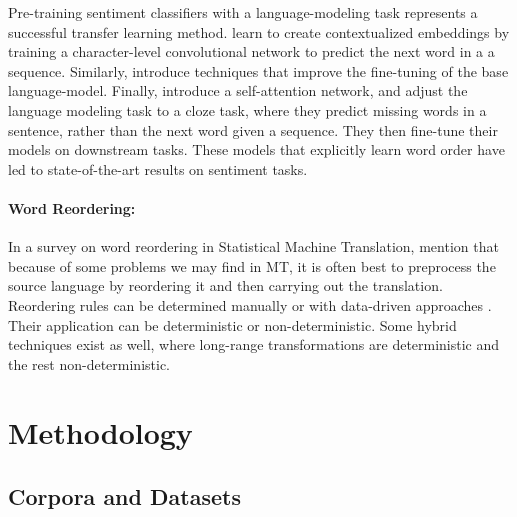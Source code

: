\documentclass[11pt,a4paper]{article}
\begin{document}
Pre-training sentiment classifiers with a language-modeling task represents a successful transfer learning method.  learn
to create contextualized embeddings by training a character-level convolutional
network to predict the next word in a a sequence. Similarly,  introduce techniques that improve the fine-tuning of the base language-model. Finally, 
 introduce a self-attention network, and adjust the language
modeling task to a cloze task, where they predict missing words in a sentence, rather than the next word given a sequence. They then fine-tune their models on downstream tasks. These models that explicitly learn word order have led to state-of-the-art results on sentiment tasks.

\paragraph{Word Reordering: }

In a survey on word reordering in Statistical Machine Translation,  mention that because of some problems we may find in MT, it is often best to preprocess the source language by reordering it and then carrying out the translation. Reordering rules can be determined manually \cite{Crego2006,Crego2006b} or with data-driven approaches \cite{Neubig2012,Nakagawa2015}. Their application can be deterministic or non-deterministic. Some hybrid techniques exist as well, where long-range transformations are deterministic and the rest non-deterministic.

\section{Methodology}

\subsection{Corpora and Datasets}
\end{document}
